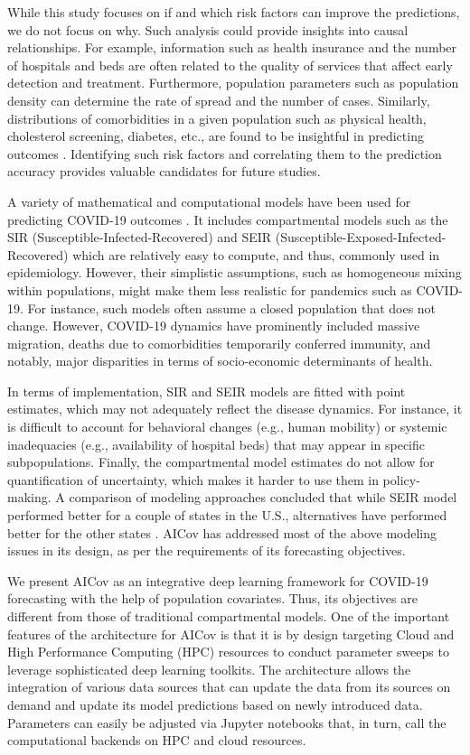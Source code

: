 \documentclass[a4paper, inpress]{jds} %
\renewcommand{\_}{%
    \textunderscore\hspace{0pt}%
}
\begin{document}
While this study focuses on if and which risk factors can improve the
predictions, we do not focus on why. Such analysis could provide
insights into causal relationships. For example, information such as
health insurance and the number of hospitals and beds are often
related to the quality of services that affect early detection and
treatment. Furthermore, population parameters such as population density can
determine the rate of spread and the number of cases. Similarly,
distributions of comorbidities in a given population such as physical
health, cholesterol screening, diabetes, etc., are found to be
insightful in predicting outcomes \citep{Maleki}. Identifying such risk
factors and correlating them to the prediction accuracy provides
valuable candidates for future studies.

A variety of mathematical and computational models have been used for
predicting COVID-19 outcomes \citep{Jewell}. It includes compartmental
models such as the SIR (Susceptible-Infected-Recovered) and SEIR
(Susceptible-Exposed-Infected-Recovered) which are relatively easy to
compute, and thus, commonly used in epidemiology. However, their
simplistic assumptions, such as homogeneous mixing within populations,
might make them less realistic for pandemics such as COVID-19. For
instance, such models often assume a closed population that does not
change. However, COVID-19 dynamics have prominently included massive
migration, deaths due to comorbidities temporarily conferred immunity,
and notably, major disparities in terms of socio-economic determinants
of health.

In terms of implementation, SIR and SEIR models are fitted with point
estimates, which may not adequately reflect the disease dynamics. For
instance, it is difficult to account for behavioral changes (e.g.,
human mobility) or systemic inadequacies (e.g., availability of
hospital beds) that may appear in specific subpopulations. Finally,
the compartmental model estimates do not allow for quantification of
uncertainty, which makes it harder to use them in policy-making. A
comparison of modeling approaches concluded that while SEIR model
performed better for a couple of states in the U.S., alternatives have
performed better for the other states \citep{Bertozzi}. AICov has
addressed most of the above modeling issues in its design, as per the
requirements of its forecasting objectives.

We present AICov as an integrative deep learning framework for
COVID-19 forecasting with the help of population covariates. Thus, its
objectives are different from those of traditional compartmental
models. One of the important features of the architecture for AICov is
that it is by design targeting Cloud and High Performance Computing
(HPC) resources to conduct parameter sweeps to leverage sophisticated
deep learning toolkits. The architecture allows the integration of
various data sources that can update the data from its sources on
demand and update its model predictions based on newly introduced
data. Parameters can easily be adjusted via Jupyter notebooks that, in
turn, call the computational backends on HPC and cloud resources.
\end{document}
